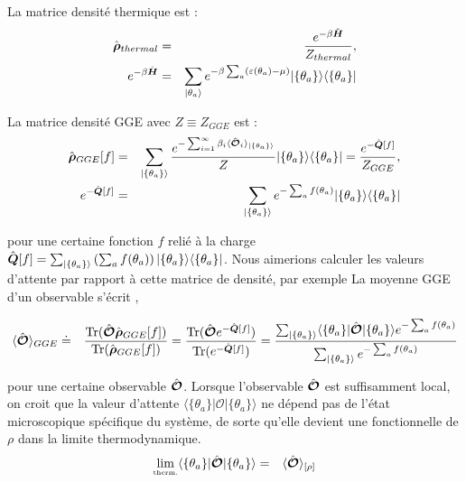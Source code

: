 	
	
	
	La matrice densité thermique est :
	\begin{eqnarray}
		\hat{\bm{\rho}}_{thermal} & = & \frac{e^{- \beta \hat{\bm{H}}}}{Z_{thermal}}, \\
		e^{-\beta \hat{\bm{H}}} & = & 	\sum_{\vert \theta_a \rangle} e^{- \beta \sum_a ( \varepsilon(\theta_a)- \mu ) } \vert \{ \theta_a\} \rangle \langle  \{ \theta_a\}  \vert 
	\end{eqnarray}
	
		
	



	

	
	La matrice densité GGE avec $Z \equiv Z_{GGE}$ est :
	\begin{eqnarray}
		\hat{\bm{\rho}}_{GGE}[f] & = & \sum_{\vert \{\theta_a \} \rangle }\frac{e^{-\sum_{i = 1}^\infty  \beta_i \langle \hat{\bm{\mathcal{O}}}_i \rangle_{\vert \{\theta_a \} \rangle} }}{Z} \vert \{\theta_a \}  \rangle   	\langle \{\theta_a \} \vert = \frac{e^{-\hat{\bm{Q}}[f]}}{Z_{GGE}}, \\
		e^{-\hat{\bm{Q}}[f]} & = & 	\sum_{\vert \{\theta_a \} \rangle } e^{- \sum_a f(\theta_a) } \vert \{ \theta_a\} \rangle \langle  \{ \theta_a\}  \vert 
	\end{eqnarray}
	
	pour une certaine fonction $f$ relié à la charge $\hat{\bm{Q}} [f]  = \sum_{\vert \{\theta_a \} \rangle } \left ( \sum_a f ( \theta_a )  \right ) \vert \{ \theta_a \} \rangle \langle \{ \theta_a \} \vert $. Nous aimerions calculer les valeurs d'attente par rapport à cette matrice de densité, par exemple
	La moyenne GGE d'un observable s'écrit ,
	
	\begin{eqnarray}
		\langle \hat{\bm{\mathcal{O}}} \rangle_{GGE} & \doteq & \displaystyle  \frac{\text{Tr} (\hat{\bm{\mathcal{O}}}\hat{\bm{\rho}}_{GGE}[f])}{\text{Tr} (\hat{\bm{\rho}}_{GGE}[f])} = \frac{\text{Tr} (\hat{\bm{\mathcal{O}}}e^{-\hat{\bm{Q}}[f]})}{\text{Tr} (e^{-\hat{\bm{Q}}[f]})}	 = \frac{ \sum_{\vert \{\theta_a \}\rangle} \langle  \{ \theta_a\}  \vert   \hat{\bm{\mathcal{O}}} \vert \{ \theta_a\} \rangle e^{- \sum_a f(\theta_a) }  }{\sum_{\vert  \{\theta_a  \} \rangle} e^{- \sum_a  f(\theta_a) } }
	\end{eqnarray}
	
	pour une certaine observable $\hat{\bm{\mathcal{O}}}$. Lorsque l'observable $\hat{\bm{\mathcal{O}}}$ est suffisamment local, on croit que la valeur d'attente $\langle  \{ \theta_a\}  \vert   \mathcal{O} \vert \{ \theta_a\} \rangle$ ne dépend pas de l'état microscopique spécifique du système, de sorte qu'elle devient une fonctionnelle de $\rho$ dans la limite thermodynamique.
	\begin{eqnarray}
		\underset{\mbox{\tiny therm.}}{\lim} \langle  \{ \theta_a\}  \vert   \hat{\bm{\mathcal{O}}} \vert \{ \theta_a\} \rangle & = & \langle \hat{\bm{\mathcal{O}}}\rangle_{[\rho]}
	\end{eqnarray}
	
